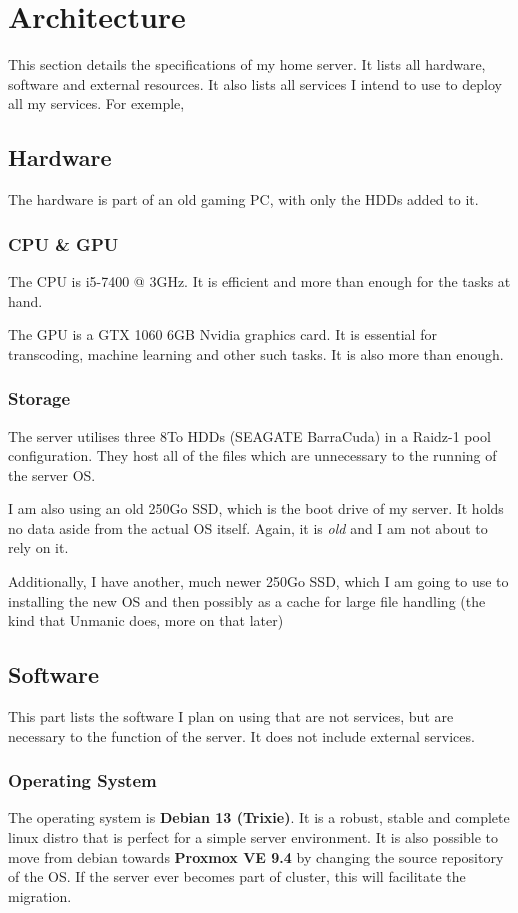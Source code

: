 \section{Architecture}
This section details the specifications of my home server. 
It lists all hardware, software and external resources. 
It also lists all services I intend to use to deploy all my services. 
For exemple, 


\subsection{Hardware}
The hardware is part of an old gaming PC, with only the HDDs added to it.
\subsubsection{CPU \& GPU}
The CPU is i5-7400 @ 3GHz. It is efficient and more than enough for the tasks at hand.

The GPU is a GTX 1060 6GB Nvidia graphics card. It is essential for transcoding, machine learning and other such tasks. It is also more than enough.

\subsubsection{Storage}
The server utilises three 8\unit{To} HDDs (SEAGATE BarraCuda) in a Raidz-1 pool configuration.
They host all of the files which are unnecessary to the running of the server OS.

I am also using an old 250\unit{Go} SSD, which is the boot drive of my server. 
It holds no data aside from the actual OS itself. Again, it is \textit{old} and I am not about to rely on it.

Additionally, I have another, much newer 250\unit{Go} SSD, which I am going to use to installing the new OS and then possibly as a cache for large file handling (the kind that Unmanic does, more on that later)

\subsection{Software}
This part lists the software I plan on using that are not services, but are necessary to the function of the server. It does not include external services.

\subsubsection{Operating System}
The operating system is \textbf{Debian 13 (Trixie)}. 
It is a robust, stable and complete linux distro that is perfect for a simple server environment.
It is also possible to move from debian towards \textbf{Proxmox VE 9.4} by changing the source repository of the OS. If the server ever becomes part of cluster, this will facilitate the migration.

